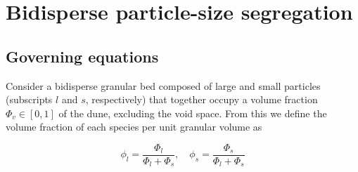 \documentclass[lineno]{JFM-FLM_Au}
\begin{document}


\section{Bidisperse particle-size segregation}
\label{Sec:segregation}

\subsection{Governing equations}
\label{Subsec:si}

Consider a bidisperse granular bed composed of large and small particles (subscripts $l$ and $s$, respectively) that together occupy a volume fraction $\Phi_v \in [0,1]$ of the dune, excluding the void space. From this we define the volume fraction of each species per unit granular volume as

\begin{equation}
    \phi_l = \frac{\Phi_l}{\Phi_l + \Phi_s}, \quad \phi_s = \frac{\Phi_s}{\Phi_l + \Phi_s}
    \label{eq:concentrations}
\end{equation}
\end{document}
